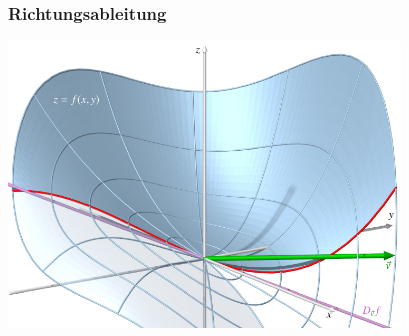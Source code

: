 %
%
%
\bgroup
\begin{frame}[t]
\setlength{\abovedisplayskip}{5pt}
\setlength{\belowdisplayskip}{5pt}
\frametitle{Richtungsableitung}
\centering
\includegraphics[width=0.78\textwidth]{../slides/1/richtungsabl.pdf}
\end{frame}
\egroup
